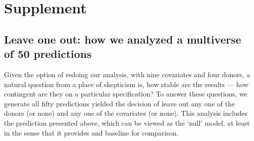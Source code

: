\documentclass[11pt,3p,review,authoryear]{elsarticle}
\theoremstyle{definition}
\begin{document}
\section{Supplement}

\subsection{Leave one out: how we analyzed a multiverse of 50 predictions}

Given the option of redoing our analysis, with nine covariates and four donors, a natural question from a place of skepticism is, how stable are the results --- how contingent are they on a particular specification?  To answer these questions, we generate all fifty predictions yielded the decision of leave out any one of the donors (or none) and any one of the covariates (or none).  This analysis includes the prediction presented above, which can be viewed as the `null' model, at least in the sense that it provides and baseline for comparison.
\end{document}
